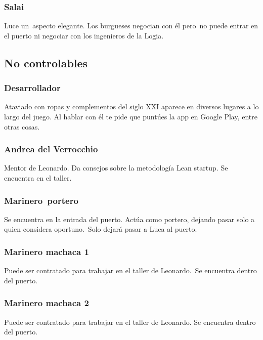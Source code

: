 \subsubsection[Salai]{ Salai}
\hypertarget{Toc484614228}{}{
Luce un\ aspecto elegante. Los burgueses negocian con \'el pero\ no puede entrar en el puerto ni negociar con los
ingenieros de la Logia.}

\subsection[No controlables]{ No controlables}
\hypertarget{Toc484614229}{}\subsubsection[Desarrollador]{ Desarrollador}
\hypertarget{Toc484614230}{}{
Ataviado con ropas y complementos del siglo XXI aparece en diversos lugares a lo largo del juego. Al hablar con \'el te
pide que punt\'ues la app en Google Play, entre otras cosas.}

\subsubsection[Andrea del Verrocchio]{ Andrea del Verrocchio}
\hypertarget{Toc484614231}{}{
Mentor de Leonardo. Da consejos sobre la metodolog\'ia Lean startup. Se encuentra en el taller.}

\subsubsection[Marinero\ portero]{ Marinero\ portero}
\hypertarget{Toc484614232}{}{
Se encuentra en la entrada del puerto. Act\'ua como portero, dejando pasar solo a quien considera oportuno.\ Solo
dejar\'a pasar a Luca al puerto.}

\subsubsection[Marinero machaca 1]{ Marinero machaca 1}
\hypertarget{Toc484614233}{}{
Puede ser contratado para trabajar en el taller de Leonardo.\ Se encuentra dentro del puerto.}

\subsubsection[Marinero machaca 2]{ Marinero machaca 2}
\hypertarget{Toc484614234}{}{
Puede ser contratado para trabajar en el taller de Leonardo. Se encuentra dentro del puerto.}

